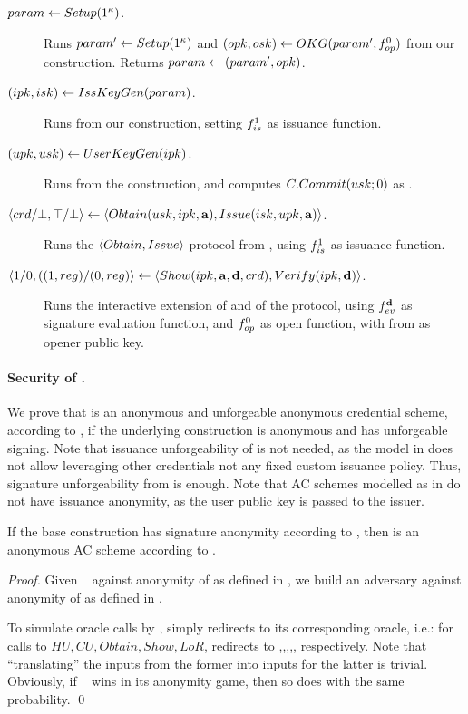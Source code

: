 \begin{description}
\item[$param \gets Setup(1^\kappa)$.] Runs $param' \gets Setup(1^\kappa)$
    and $(opk,osk) \gets OKG(param',f_{op}^0)$ from our \CUASGen
    construction. Returns $param \gets (param',opk)$.
\item[$(ipk,isk) \gets IssKeyGen(param)$.] Runs \IKeyGen from our
  \CUASGen construction, setting $f_{is}^1$ as issuance function.
\item[$(upk,usk) \gets UserKeyGen(ipk)$.] Runs \UKeyGen from the
  \CUASGen construction, and computes $C.Commit(usk;0)$ as \upk.
\item[$\langle crd/\bot,\top/\bot \rangle \gets
  \langle Obtain(usk,ipk,\mathbf{a}),Issue(isk,upk,\mathbf{a}) \rangle$.]
  Runs the $\langle Obtain,Issue \rangle$ protocol from \CUASGen, using
  $f_{is}^1$ as issuance function.
\item[$\langle 1/0,((1,reg)/(0,reg)\rangle
  \gets \langle Show(ipk,\mathbf{a},\mathbf{d},
  crd),Verify(ipk,\mathbf{d}) \rangle$.]
  Runs the interactive extension of \Sign and \Verify of the \CUASGen protocol,
  using $f_{ev}^{\mathbf{d}}$ as signature evaluation function, and $f_{op}^0$ as
  open function, with \opk from \parm as opener public key.
\end{description}

\paragraph{Security of \CUASAC.} %
We prove that \CUASAC is an anonymous and unforgeable anonymous credential
scheme, according to \cite{fhs19}, if the underlying \CUASGen construction
is anonymous and has unforgeable signing. Note that issuance unforgeability
of \CUASGen is not needed, as the model in \cite{fhs19} does not allow
leveraging other credentials not any fixed custom issuance policy. Thus,
signature unforgeability from \UAS is enough. Note that AC schemes modelled
as in \cite{fhs19} do not have issuance anonymity, as the user public key
is passed to the issuer.

\begin{theorem}
  \label{thm:anon-cuasac}
  If the base \CUASGen construction has signature anonymity according to
  , then \CUASAC is an anonymous AC scheme
  according to \cite{fhs19}.
\end{theorem}

\begin{proof}
  Given \adv~ against anonymity of \CUASAC as defined in \cite{fhs19}, we build
  an adversary \advB against anonymity of \CUASGen as defined in
  .

  To simulate oracle calls by \adv, \advB simply redirects to its corresponding
  oracle, i.e.: for calls to $HU,CU,Obtain,Show,LoR$, \advB redirects to
  \HUGEN,\CUGEN,\OBTAIN,\SIGN,\CHALb, respectively. Note that ``translating''
  the inputs from the former into inputs for the latter is trivial.
  Obviously, if \adv~ wins in its anonymity game, then so does \advB with the
  same probability.
  \qed
\end{proof}

